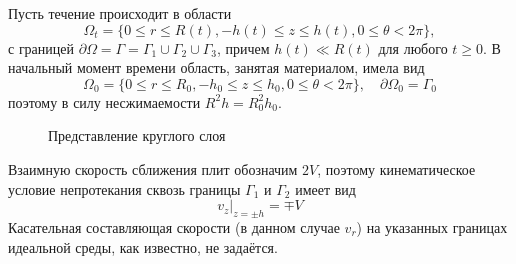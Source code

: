 Пусть течение происходит в области
\begin{equation}
  \Omega_{t} = \{0 \le r \le R(t), -h(t) \le z \le h(t), 0 \le \theta < 2\pi\},
\end{equation}
с границей $\partial\Omega = \Gamma = \Gamma_{1} \cup \Gamma_{2} \cup \Gamma_{3}$, причем $h(t) \ll R(t)$ для любого $t \ge 0$. В начальный момент времени область, занятая материалом, имела вид
\begin{equation}
  \Omega_{0} = \{0 \le r \le R_{0}, -h_{0} \le z \le h_{0}, 0 \le \theta < 2\pi\}, \quad \partial\Omega_{0} = \Gamma_{0}
\end{equation}
поэтому в силу несжимаемости $R^{2} h=R^{2}_{0} h_{0}$.

\begin{figure}[ht]
    \caption{Представление круглого слоя}
    \label{fig:ch1/layer}
\end{figure}
Взаимную скорость сближения плит обозначим $2V$, поэтому кинематическое условие непротекания сквозь границы $\Gamma_{1}$ и $\Gamma_{2}$ имеет вид
\begin{equation}
  \label{eq:ch1/sec1/boundary/kinematic}
  v_{z}\lvert_{z=\pm h} = \mp V
\end{equation}
Касательная составляющая скорости (в данном случае $v_{r}$) на указанных границах идеальной среды, как известно, не задаётся.

